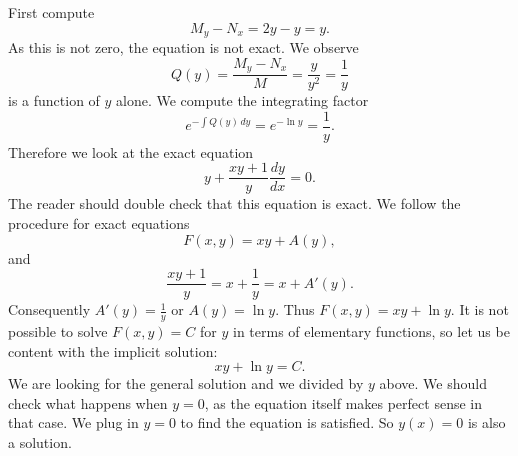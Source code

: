 \documentclass{ximera}
\begin{document}
\begin{exampleSol}
    First compute
    \begin{equation*}
        M_y-N_x = 2y-y = y .
    \end{equation*}
    As this is not zero, the equation is not exact.  We observe
    \begin{equation*}
        Q(y) = \frac{M_y-N_x}{M} = \frac{y}{y^2} = \frac{1}{y} 
    \end{equation*}
    is a function of $y$ alone.    We compute the integrating factor
    \begin{equation*}
        e^{-\int  Q(y) \, dy} = e^{-\ln y} = \frac{1}{y} .
    \end{equation*}
    Therefore we look at the exact equation
    \begin{equation*}
        y + \frac{xy+1}{y} \frac{dy}{dx} = 0 .
    \end{equation*}
    The reader should double check that this equation is exact. We follow the procedure for exact equations
    \begin{equation*}
        F(x,y) = xy + A(y) ,
    \end{equation*}
    and
    \begin{equation}
        \frac{xy+1}{y} = x+\frac{1}{y} = x+ A'(y) .
    \end{equation}
    Consequently $A'(y) = \frac{1}{y}$ or $A(y) = \ln y$.  Thus $F(x,y) = xy + \ln y$. It is not possible to solve $F(x,y)=C$ for $y$ in terms of elementary functions, so  let us be content with the implicit solution:
    \begin{equation*}
        xy + \ln y = C .
    \end{equation*}
    We are looking for the general solution and we divided by $y$ above.  We should check what happens when $y=0$, as the equation itself makes perfect sense in that case.  We plug in $y=0$ to find the equation is satisfied.  So $y(x)=0$ is also a solution.
\end{exampleSol}
\end{document}
